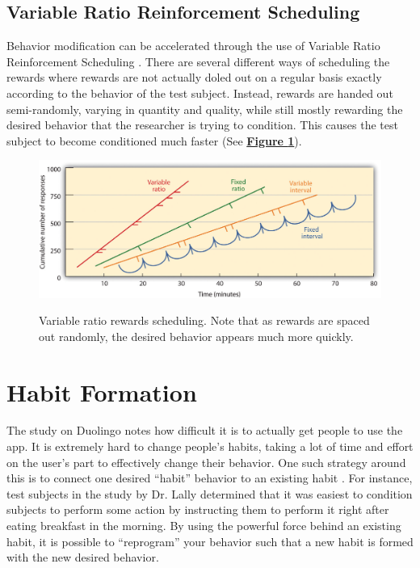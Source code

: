 \par 


\subsection{Variable Ratio Reinforcement Scheduling}
 Behavior modification can be accelerated through the use of Variable Ratio Reinforcement Scheduling \cite{ferster1957schedules} \cite{hardy_heyes_1999}. There are several different ways of scheduling the rewards  where rewards are not actually doled out on a regular basis exactly according to the behavior of the test subject. Instead, rewards are handed out semi-randomly, varying in quantity and quality, while still mostly rewarding the desired behavior that the researcher is trying to condition. This causes the test subject to become conditioned much faster (See \textbf{\hyperref[fig:variable_ratio]{Figure \ref*{fig:variable_ratio}}}).
 
 \begin{figure}[h]
 	\includegraphics[width=1.0\linewidth]{figures/variable_ratio}
 	\caption{Variable ratio rewards scheduling. Note that as rewards are spaced out randomly, the desired behavior appears much more quickly.}
 	\label{fig:variable_ratio}
 	\cite{hardy_heyes_1999}
 \end{figure}

\section{Habit Formation}



The study on Duolingo notes how difficult it is to actually get people to use the app. It is extremely hard to change people's habits, taking a lot of time and effort on the user's part to effectively change their behavior. One such strategy around this is to connect one desired ``habit'' behavior to an existing habit \cite{lally2010habits}. For instance, test subjects in the study by Dr. Lally determined that it was easiest to condition subjects to perform some action by instructing them to perform it right after eating breakfast in the morning. By using the powerful force behind an existing habit, it is possible to ``reprogram'' your behavior such that a new habit is formed with the new desired behavior.


